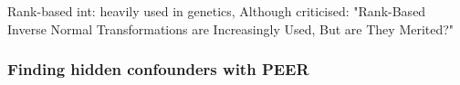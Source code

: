 Rank-based int:
heavily used in genetics, 
    Although criticised: "Rank-Based Inverse Normal Transformations are Increasingly Used, But are They Merited?"

\subsubsection{Finding hidden confounders with PEER}


